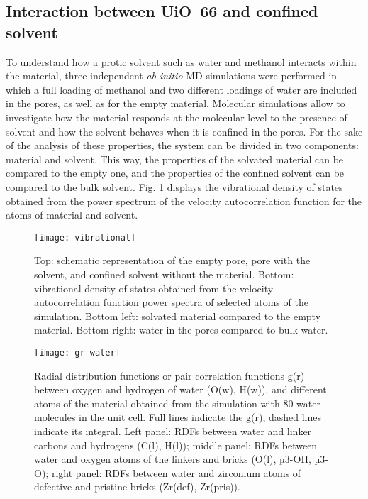 \subsection*{Interaction between UiO--66 and confined solvent}
To understand how a protic solvent such as water and methanol interacts within the material, three independent \textit{ab initio} MD simulations were performed in which a full loading of methanol and two different loadings of water are included in the pores, as well as for the empty material. Molecular simulations allow to investigate how the material responds at the molecular level to the presence of solvent and how the solvent behaves when it is confined in the pores. For the sake of the analysis of these properties, the system can be divided in two components: material and solvent. This way, the properties of the solvated material can be compared to the empty one, and the properties of the confined solvent can be compared to the bulk solvent. Fig. \ref{fig:vibrational} displays the vibrational density of states obtained from the power spectrum of the velocity autocorrelation function for the atoms of material and solvent. 
\npar
\begin{figure}[!htbp]
	\centering
	\texttt{[image: vibrational]}
	\caption{Top: schematic representation of the empty pore, pore with the solvent, and confined solvent without the material. Bottom: vibrational density of states obtained from the velocity autocorrelation function power spectra of selected atoms of the simulation. Bottom left: solvated material compared to the empty material. Bottom right: water in the pores compared to bulk water.}
	\label{fig:vibrational}
\end{figure}
\begin{figure}[!htbp]
	\centering
	\texttt{[image: gr-water]}
	\caption{Radial distribution functions or pair correlation functions g(r) between oxygen and hydrogen of water (O(w), H(w)), and different atoms of the material obtained from the simulation with 80 water molecules in the unit cell. Full lines indicate the g(r), dashed lines indicate its integral. Left panel: RDFs between water and linker carbons and hydrogens (C(l), H(l)); middle panel: RDFs between water and oxygen atoms of the linkers and bricks (O(l), µ3-OH, µ3-O); right panel: RDFs between water and zirconium atoms of defective and pristine bricks (Zr(def), Zr(pris)). }
	\label{fig:gr-water}
\end{figure}
